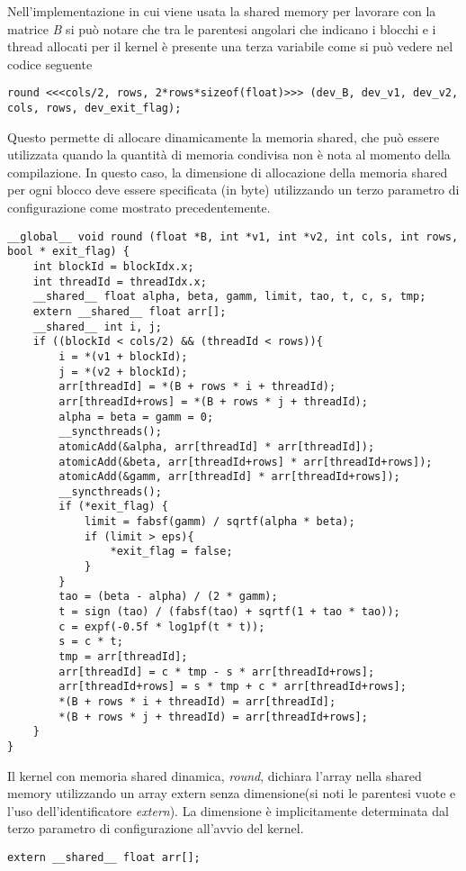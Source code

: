 \label{sec:Shared}
Nell'implementazione in cui viene usata la shared memory per lavorare con la matrice \textit{B} si può notare che tra le parentesi angolari che indicano i blocchi e i thread allocati per il kernel è presente una terza variabile come si può vedere nel codice seguente
\begin{lstlisting}
round <<<cols/2, rows, 2*rows*sizeof(float)>>> (dev_B, dev_v1, dev_v2, cols, rows, dev_exit_flag);
\end{lstlisting}
Questo permette di allocare dinamicamente la memoria shared, che può essere utilizzata quando la quantità di memoria condivisa non è nota al momento della compilazione. In questo caso, la dimensione di allocazione della memoria shared per ogni blocco deve essere specificata (in byte) utilizzando un terzo parametro di configurazione come mostrato precedentemente.
\begin{lstlisting}
__global__ void round (float *B, int *v1, int *v2, int cols, int rows, bool * exit_flag) {
	int blockId = blockIdx.x;
	int threadId = threadIdx.x;
	__shared__ float alpha, beta, gamm, limit, tao, t, c, s, tmp;
	extern __shared__ float arr[];
	__shared__ int i, j;
	if ((blockId < cols/2) && (threadId < rows)){
		i = *(v1 + blockId);
		j = *(v2 + blockId);
		arr[threadId] = *(B + rows * i + threadId);
		arr[threadId+rows] = *(B + rows * j + threadId);
		alpha = beta = gamm = 0;
		__syncthreads();
		atomicAdd(&alpha, arr[threadId] * arr[threadId]);
		atomicAdd(&beta, arr[threadId+rows] * arr[threadId+rows]);	
		atomicAdd(&gamm, arr[threadId] * arr[threadId+rows]);
		__syncthreads();
		if (*exit_flag) {
			limit = fabsf(gamm) / sqrtf(alpha * beta);
			if (limit > eps){
				*exit_flag = false;
			}
		}
		tao = (beta - alpha) / (2 * gamm);
		t = sign (tao) / (fabsf(tao) + sqrtf(1 + tao * tao)); 
		c = expf(-0.5f * log1pf(t * t));
		s = c * t;
		tmp = arr[threadId];
		arr[threadId] = c * tmp - s * arr[threadId+rows];
		arr[threadId+rows] = s * tmp + c * arr[threadId+rows];
		*(B + rows * i + threadId) = arr[threadId];
		*(B + rows * j + threadId) = arr[threadId+rows];
	}
}
\end{lstlisting}
Il kernel con memoria shared dinamica, \textit{round}, dichiara l'array nella shared memory utilizzando un array extern senza dimensione(si noti le parentesi vuote e l'uso dell'identificatore \textit{extern}). La dimensione è implicitamente determinata dal terzo parametro di configurazione all'avvio del kernel.
\begin{lstlisting}
extern __shared__ float arr[];
\end{lstlisting}
